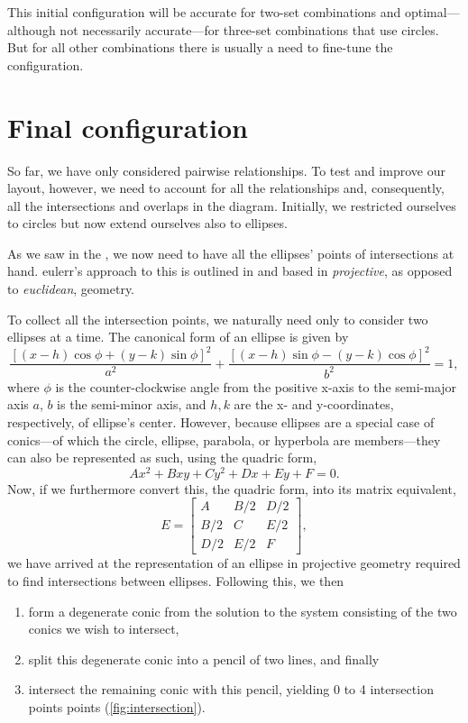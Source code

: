 \documentclass[
  oneside,
  openany,
  numbers=noendperiod,
  parskip=half,
  bibliography=totoc
]{scrbook}\usepackage[]{graphicx}\usepackage{xcolor}
\newcommand{\pkg}[1]{{\fontseries{b}\selectfont #1}}
\begin{document}
This initial configuration will be accurate for two-set combinations and optimal---although not necessarily accurate---for three-set combinations that use circles. But for all other combinations there is usually a need to fine-tune the configuration.

\section{Final configuration}
\label{sec:finalConfig}

So far, we have only considered pairwise relationships. To test and improve our
layout, however, we need to account for all the relationships and, consequently,
all the intersections and overlaps in the diagram. Initially, we restricted
ourselves to circles but now extend ourselves also to ellipses.

As we saw in the , we now need to have all the ellipses'
points of intersections at hand. \pkg{eulerr}'s approach to this is outlined in
\citet{richter-gebert_2011} and based in \emph{projective}, as opposed to
\emph{euclidean}, geometry.

To collect all the intersection points, we naturally need only to consider two
ellipses at a time. The canonical form of an ellipse is given by
\[
\frac{\left[ (x-h)\cos{\phi}+(y-k)\sin{\phi} \right]^2}{a^2}+
  \frac{\left[(x-h) \sin{\phi}-(y-k) \cos{\phi}\right]^2}{b^2} = 1,
\]
where $\phi$ is the counter-clockwise angle from the positive x-axis to the
semi-major axis $a$, $b$ is the semi-minor axis, and $h, k$ are the x- and
y-coordinates, respectively, of ellipse's center. However, because ellipses
are a special case of conics---of which the circle, ellipse, parabola, or
hyperbola are members---they can also be represented as such, using the quadric
form,
\[
Ax^2 + Bxy + Cy^2 + Dx + Ey + F = 0.
\]
Now, if we furthermore convert this, the quadric form, into its matrix
equivalent,
\[
E = \begin{bmatrix}
      A   & B/2 & D/2 \\
      B/2 & C   & E/2 \\
      D/2 & E/2 & F
    \end{bmatrix},
\]
we have arrived at the representation of an ellipse in projective geometry
required to find intersections between ellipses. Following this, we then
\begin{enumerate}
\item form a degenerate conic from the solution to the system consisting of the
  two conics we wish to intersect,
\item split this degenerate conic into a pencil of two lines, and finally
\item intersect the remaining conic with this pencil, yielding 0 to 4
  intersection points points (\cref{fig:intersection}).
\end{enumerate}
\end{document}
